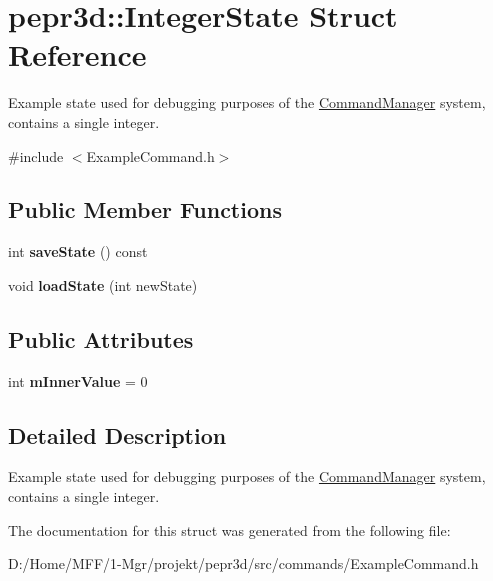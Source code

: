 \hypertarget{structpepr3d_1_1_integer_state}{}\section{pepr3d\+::Integer\+State Struct Reference}
\label{structpepr3d_1_1_integer_state}


Example state used for debugging purposes of the \mbox{\hyperlink{classpepr3d_1_1_command_manager}{Command\+Manager}} system, contains a single integer.  




{\ttfamily \#include $<$Example\+Command.\+h$>$}

\subsection*{Public Member Functions}
\begin{DoxyCompactItemize}
\item 
\mbox{\label{structpepr3d_1_1_integer_state_ade8303191eb97f36da4f74ffccdb6f28}} 
int {\bfseries save\+State} () const
\item 
\mbox{\label{structpepr3d_1_1_integer_state_a5551501a7645b771c495a21e3bcaa411}} 
void {\bfseries load\+State} (int new\+State)
\end{DoxyCompactItemize}
\subsection*{Public Attributes}
\begin{DoxyCompactItemize}
\item 
\mbox{\label{structpepr3d_1_1_integer_state_adc73959a7201be2f1251a0043035b93d}} 
int {\bfseries m\+Inner\+Value} = 0
\end{DoxyCompactItemize}


\subsection{Detailed Description}
Example state used for debugging purposes of the \mbox{\hyperlink{classpepr3d_1_1_command_manager}{Command\+Manager}} system, contains a single integer. 

The documentation for this struct was generated from the following file\+:\begin{DoxyCompactItemize}
\item 
D\+:/\+Home/\+M\+F\+F/1-\/\+Mgr/projekt/pepr3d/src/commands/Example\+Command.\+h\end{DoxyCompactItemize}
